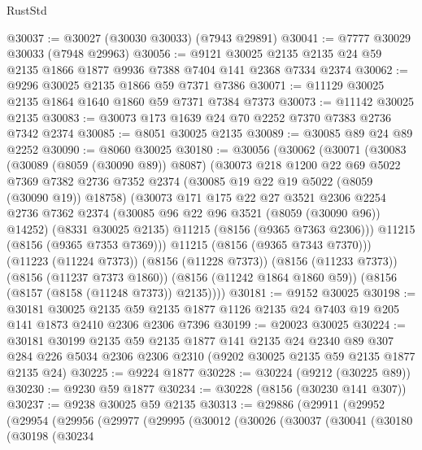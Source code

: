 \begin{lexlean}{RustStd}
\begin{coremodule}
@30037 := @30027 (@30030 @30033) (@7943 @29891)
@30041 := @7777 @30029 @30033 (@7948 @29963)
@30056 := @9121
    @30025
    @2135
    @2135
    @24
    @59
    @2135
    @1866
    @1877
    @9936
    @7388
    @7404
    @141
    @2368
    @7334
    @2374
@30062 := @9296 @30025 @2135 @1866 @59 @7371 @7386
@30071 := @11129 @30025 @2135 @1864 @1640 @1860 @59 @7371 @7384 @7373
@30073 := @11142 @30025 @2135
@30083 := @30073 @173 @1639 @24 @70 @2252 @7370 @7383 @2736 @7342 @2374
@30085 := @8051 @30025 @2135
@30089 := @30085 @89 @24 @89 @2252
@30090 := @8060 @30025
@30180 := @30056
    (@30062
      (@30071
        (@30083
          (@30089 (@8059 (@30090 @89)) @8087)
          (@30073
            @218
            @1200
            @22
            @69
            @5022
            @7369
            @7382
            @2736
            @7352
            @2374
            (@30085 @19 @22 @19 @5022 (@8059 (@30090 @19)) @18758)
            (@30073
              @171
              @175
              @22
              @27
              @3521
              @2306
              @2254
              @2736
              @7362
              @2374
              (@30085 @96 @22 @96 @3521 (@8059 (@30090 @96)) @14252)
              (@8331 @30025 @2135)
              @11215
              (@8156 (@9365 @7363 @2306)))
            @11215
            (@8156 (@9365 @7353 @7369)))
          @11215
          (@8156 (@9365 @7343 @7370)))
        (@11223 (@11224 @7373))
        (@8156 (@11228 @7373))
        (@8156 (@11233 @7373))
        (@8156 (@11237 @7373 @1860))
        (@8156 (@11242 @1864 @1860 @59))
        (@8156 (@8157 (@8158 (@11248 @7373)) @2135))))
@30181 := @9152 @30025
@30198 := @30181
    @30025
    @2135
    @59
    @2135
    @1877
    @1126
    @2135
    @24
    @7403
    @19
    @205
    @141
    @1873
    @2410
    @2306
    @2306
    @7396
@30199 := @20023 @30025
@30224 := @30181
    @30199
    @2135
    @59
    @2135
    @1877
    @141
    @2135
    @24
    @2340
    @89
    @307
    @284
    @226
    @5034
    @2306
    @2306
    @2310
    (@9202 @30025 @2135 @59 @2135 @1877 @2135 @24)
@30225 := @9224 @1877
@30228 := @30224 (@9212 (@30225 @89))
@30230 := @9230 @59 @1877
@30234 := @30228 (@8156 (@30230 @141 @307))
@30237 := @9238 @30025 @59 @2135
@30313 := @29886
    (@29911
      (@29952
        (@29954
          (@29956
            (@29977
              (@29995
                (@30012
                  (@30026
                    (@30037
                      (@30041
                        (@30180
                          (@30198
                            (@30234

\end{coremodule}
\end{lexlean}
